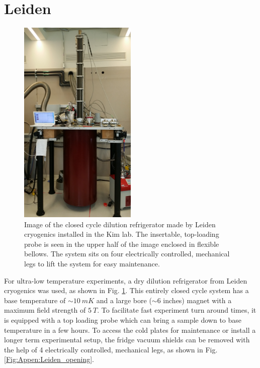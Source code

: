 \section{Leiden}
\begin{figure}
\centering
\includegraphics[angle=-90, width = 0.5\textwidth]{figures/appendix/cryostats/Leiden_closed.jpg}
\caption{Image of the closed cycle dilution refrigerator made by Leiden cryogenics installed in the Kim lab. The insertable, top-loading probe is seen in the upper half of the image enclosed in flexible bellows. The system sits on four electrically controlled, mechanical legs to lift the system for easy maintenance.}
\label{Fig:Appen:Leiden_closed}
\end{figure}

For ultra-low temperature experiments, a dry dilution refrigerator from Leiden cryogenics was used, as shown in Fig. \ref{Fig:Appen:Leiden_closed}. This entirely closed cycle system has a base temperature of ${\sim}10~mK$ and a large bore (${\sim}6$ inches) magnet with a maximum field strength of $5~T$. To facilitate fast experiment turn around times, it is equipped with a top loading probe which can bring a sample down to base temperature in a few hours. To access the cold plates for maintenance or install a longer term experimental setup, the fridge vacuum shields can be removed with the help of 4 electrically controlled, mechanical legs, as shown in Fig. \ref{Fig:Appen:Leiden_opening}.  

